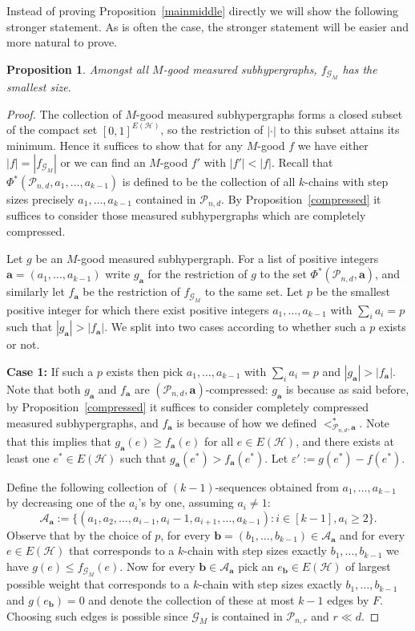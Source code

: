 \documentclass[12pt]{article}
\newtheorem{prop}[theorem]{Proposition}
\numberwithin{equation}{section}
\def\A{\mathcal{A}}
\def\G{\mathcal{G}}
\def\HH{\mathcal{H}}
\def\P{\mathcal{P}}
\def\eps{\varepsilon}
\begin{document}
Instead of proving Proposition~\ref{mainmiddle} directly we will show the following stronger statement. As is often the case, the stronger statement will be easier and more natural to prove.
\begin{prop}\label{mainmiddlestrong}
Amongst all $M$-good measured subhypergraphs, $f_{\G_M}$ has the smallest size.
\end{prop}
\begin{proof}
The collection of $M$-good measured subhypergraphs forms a closed subset of the compact set $[0,1]^{E(\HH)}$, so the restriction of $|\cdot|$ to this subset attains its minimum. Hence it suffices to show that for any $M$-good $f$ we have either $|f|=|f_{\G_M}|$ or we can find an $M$-good $f'$ with $|f'|<|f|$.  Recall that $\Phi^*(\P_{n,d},a_1,\ldots,a_{k-1})$ is defined to be the collection of all $k$-chains with step sizes precisely $a_1,\ldots,a_{k-1}$ contained in $\P_{n,d}$. By Proposition~\ref{compressed} it suffices to consider those measured subhypergraphs which are completely compressed.

Let $g$ be an $M$-good measured subhypergraph. For a list of positive integers $\mathbf{a}=(a_1,\ldots,a_{k-1})$ write $g_{\mathbf{a}}$ for the restriction of $g$ to the set $\Phi^*(\P_{n,d},\mathbf{a})$, and similarly let $f_{\mathbf{a}}$ be the restriction of $f_{\G_M}$ to the same set. Let $p$ be the smallest positive integer for which there exist positive integers $a_1,\ldots, a_{k-1}$ with $\sum_i a_i=p$ such that $|g_{\mathbf{a}}|>|f_{\mathbf{a}}|$. We split into two cases according to whether such a $p$ exists or not. 

{\bf Case 1:} If such a $p$ exists then pick $a_1,\ldots,a_{k-1}$ with $\sum_i a_i=p$ and $|g_{\mathbf{a}}|>|f_{\mathbf{a}}|$.  Note that both $g_{\mathbf{a}}$ and $f_{\mathbf{a}}$ are $(\P_{n,d},\mathbf{a})$-compressed: $g_{\mathbf{a}}$ is because as said before, by Proposition~\ref{compressed} it suffices to consider completely compressed measured subhypergraphs, and $f_{\mathbf{a}}$ is because of how we defined $<^*_{\P_{n,d},\mathbf{a}}$. Note that this implies that $g_\mathbf{a}(e)\geq f_{\mathbf{a}}(e)$ for all $e\in E(\HH)$, and there exists at least one $e^*\in E(\HH)$ such that $g_{\mathbf{a}}(e^*)>f_{\mathbf{a}}(e^*)$.
Let $\eps':=g(e^*)-f(e^*).$

Define the following collection of $(k-1)$-sequences obtained from $a_1,\ldots,a_{k-1}$ by decreasing one of the $a_i$'s by one, assuming $a_i\neq 1$:  $$\A_{\mathbf{a}}:=\{(a_1,a_2,\ldots,a_{i-1},a_i-1,a_{i+1},\ldots,a_{k-1}): i\in [k-1], a_i\geq 2\}.$$
Observe that by the choice of $p$, for every $\mathbf{b}=(b_1,\ldots,b_{k-1})\in\A_{\mathbf{a}}$ and for every $e\in E(\HH)$ that corresponds to a $k$-chain with step sizes exactly $b_1,\ldots,b_{k-1}$ we have $g(e)\leq f_{\G_M}(e)$. Now for every $\mathbf{b}\in\A_{\mathbf{a}}$ pick an $e_{\mathbf{b}}\in E(\HH)$ of largest possible weight that corresponds to a $k$-chain with step sizes exactly $b_1,\ldots,b_{k-1}$ and $g(e_{\mathbf{b}})=0$ and denote the collection of these at most $k-1$ edges by $F$. Choosing such edges is possible since $\G_M$ is contained in $\P_{n,r}$ and $r\ll d$.


\end{proof}
\end{document}
